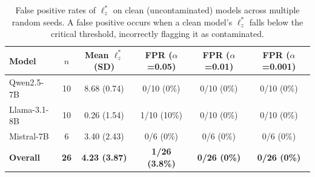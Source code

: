 
\begin{table}[h]
\centering
\caption{False positive rates of $\ell_z^*$ on clean (uncontaminated) models across multiple random seeds. A false positive occurs when a clean model's $\ell_z^*$ falls below the critical threshold, incorrectly flagging it as contaminated.}
\label{tab:fpr}
\begin{tabular}{lccccc}
\toprule
Model & $n$ & Mean $\ell_z^*$ (SD) & FPR ($\alpha$=0.05) & FPR ($\alpha$=0.01) & FPR ($\alpha$=0.001) \\
\midrule
Qwen2.5-7B  & 10 & 8.68 (0.74) & 0/10 (0\%) & 0/10 (0\%) & 0/10 (0\%) \\
Llama-3.1-8B & 10 & 0.26 (1.54) & 1/10 (10\%) & 0/10 (0\%) & 0/10 (0\%) \\
Mistral-7B  & 6  & 3.40 (2.43) & 0/6 (0\%) & 0/6 (0\%) & 0/6 (0\%) \\
\midrule
\textbf{Overall} & \textbf{26} & \textbf{4.23 (3.87)} & \textbf{1/26 (3.8\%)} & \textbf{0/26 (0\%)} & \textbf{0/26 (0\%)} \\
\bottomrule
\end{tabular}
\end{table}

